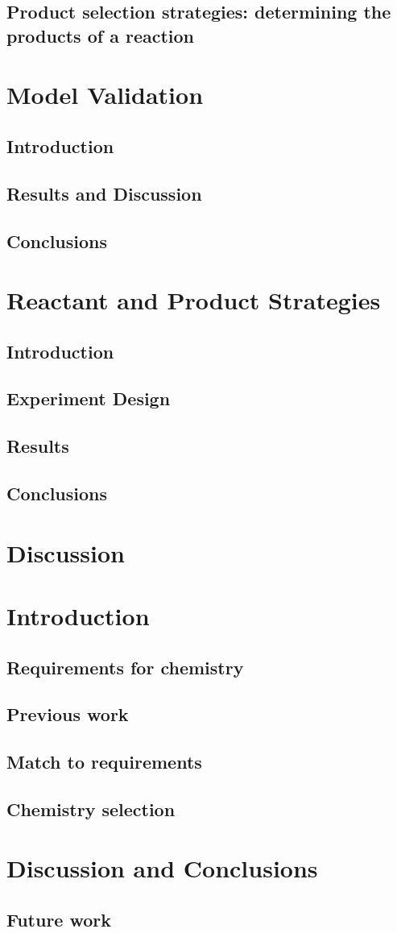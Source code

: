 \documentclass[]{report}
\begin{document}
\section{Product selection strategies: determining the products of a reaction}

\chapter{Model Validation}
\section{Introduction}
\section{Results and Discussion}
\section{Conclusions}

\chapter{Reactant and Product Strategies}
\section{Introduction}
\section{Experiment Design}
\section{Results}
\section{Conclusions}

\chapter{Discussion}

\chapter{Introduction}
\section{Requirements for chemistry}
\section{Previous work}
\section{Match to requirements}
\section{Chemistry selection}

\chapter{Discussion and Conclusions}
\section{Future work}
\end{document}
